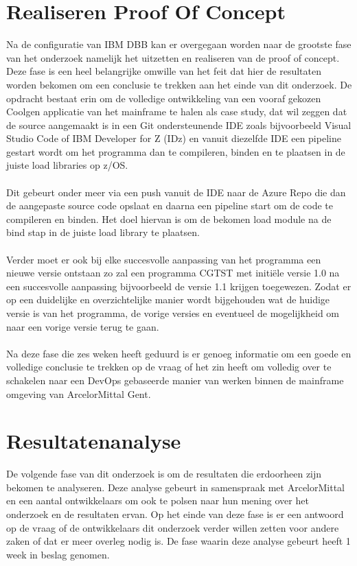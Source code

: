 \section{Realiseren Proof Of Concept}
\label{sec:poc}
Na de configuratie van IBM DBB kan er overgegaan worden naar de grootste fase van het onderzoek namelijk het uitzetten en realiseren van de proof of concept.
Deze fase is een heel belangrijke omwille van het feit dat hier de resultaten worden bekomen om een conclusie te trekken aan het einde van dit onderzoek.
De opdracht bestaat erin om de volledige ontwikkeling van een vooraf gekozen Coolgen applicatie van het mainframe te halen als case study, dat wil zeggen dat de source aangemaakt is in een Git ondersteunende IDE zoals bijvoorbeeld Visual Studio Code of IBM Developer for Z (IDz) en vanuit diezelfde IDE een pipeline gestart wordt om het programma dan te compileren, binden en te plaatsen in de juiste load libraries op z/OS.
\\ \\
Dit gebeurt onder meer via een push vanuit de IDE naar de Azure Repo die dan de aangepaste source code opslaat en daarna een pipeline start om de code te compileren en binden. Het doel hiervan is om de bekomen load module na de bind stap in de juiste load library te plaatsen.
\\ \\
Verder moet er ook bij elke succesvolle aanpassing van het programma een nieuwe versie ontstaan zo zal een programma CGTST met initiële versie 1.0 na een succesvolle
aanpassing bijvoorbeeld de versie 1.1 krijgen toegewezen.
Zodat er op een duidelijke en overzichtelijke manier wordt bijgehouden wat de huidige versie is van het programma, de vorige versies en eventueel de mogelijkheid om naar een vorige versie terug te gaan.
\\ \\
Na deze fase die zes weken heeft geduurd is er genoeg informatie om een goede en volledige conclusie te trekken op de vraag of het zin heeft om volledig over te schakelen naar een DevOps gebaseerde manier van werken binnen de mainframe omgeving van ArcelorMittal Gent.

\section{Resultatenanalyse}
\label{sec:resulatatenanalyse}
De volgende fase van dit onderzoek is om de resultaten die erdoorheen zijn bekomen te analyseren. Deze analyse gebeurt in samenspraak met ArcelorMittal en een aantal ontwikkelaars om ook te polsen naar hun mening over het onderzoek en de resultaten ervan.
Op het einde van deze fase is er een antwoord op de vraag of de ontwikkelaars dit onderzoek verder willen zetten voor andere zaken of dat er meer overleg nodig is. 
De fase waarin deze analyse gebeurt heeft 1 week in beslag genomen.


